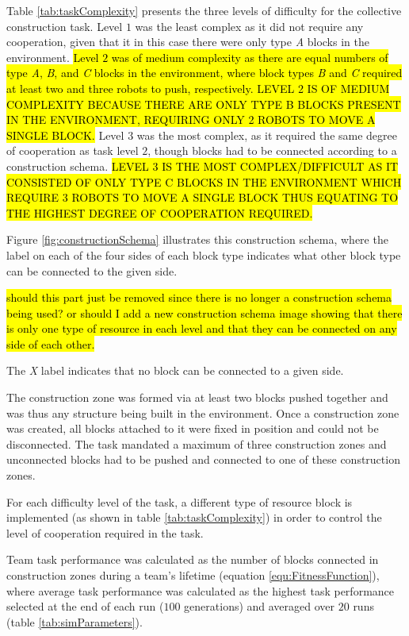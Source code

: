 Table \ref{tab:taskComplexity} presents the three levels of difficulty for the
collective construction task.  Level $1$ was the least complex as it did not require
any cooperation, given that it in this case there were only type \textit{A}
blocks in the environment.
\hl{Level $2$ was of medium complexity as there are equal numbers of type \textit{A},
\textit{B}, and \textit{C} blocks in the environment, where block types \textit{B} and \textit{C} required
at least two and three robots to push, respectively. LEVEL 2 IS OF MEDIUM COMPLEXITY BECAUSE THERE ARE ONLY TYPE B BLOCKS PRESENT IN THE ENVIRONMENT, REQUIRING ONLY 2 ROBOTS TO MOVE A SINGLE BLOCK.}
Level $3$ was the most complex, as it required the same degree of cooperation as task level
$2$, though blocks had to be connected according to a construction schema. \hl{LEVEL 3 IS THE MOST COMPLEX/DIFFICULT AS IT CONSISTED OF ONLY TYPE C BLOCKS IN THE ENVIRONMENT WHICH REQUIRE 3 ROBOTS TO MOVE A SINGLE BLOCK THUS EQUATING TO THE HIGHEST DEGREE OF COOPERATION REQUIRED.}

Figure \ref{fig:constructionSchema}
illustrates this construction schema, where the label on each of the
four sides of each block type indicates what other block type can be connected to the given side.

\hl{should this part just be removed since there is no longer a construction schema being used? or should I add a new construction schema image showing that there is only one type of resource in each level and that they can be connected on any side of each other.}

The \textit{X} label indicates that no block can be connected to a given side.

The construction zone was formed via at least two blocks pushed together and
was thus any structure being built in the environment.
Once a construction zone was created, all blocks attached to it were fixed in position
and could not be disconnected.
The task mandated a maximum of three construction zones and unconnected blocks
had to be pushed and connected to one of these construction zones.

For each difficulty level of the task, a different type of resource block is implemented (as shown in table \ref{tab:taskComplexity}) in order to control the level of cooperation required in the task.

Team task performance was calculated as the number of blocks connected in construction zones
during a team's lifetime (equation \ref{equ:FitnessFunction}),
where average task performance was calculated as the highest task
performance selected at the end of each run ($100$ generations) and averaged over $20$ runs
(table \ref{tab:simParameters}).


